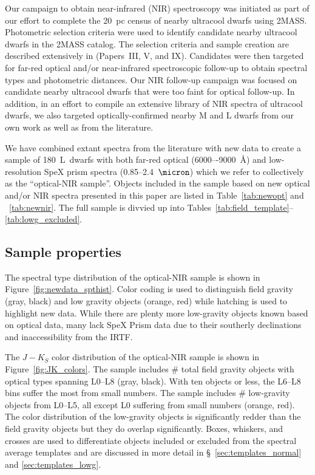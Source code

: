 \documentclass[12pt,preprint]{aastex}
\newcommand{\sample}{180}
\newcommand{\newopt}{19} %
\newcommand{\prismspectra}{140} %
\begin{document}
Our campaign to obtain near-infrared (NIR) spectroscopy was initiated as part of our effort to complete the 20~pc census of nearby ultracool dwarfs using 2MASS. Photometric selection criteria were used to identify candidate nearby ultracool dwarfs in the 2MASS catalog. The selection criteria and sample creation are described extensively in \cite{Cruz03,Cruz07,Reid08} (Papers~III, V, and IX). Candidates were then targeted for far-red optical and/or near-infrared spectroscopic follow-up to obtain spectral types and photometric distances. Our NIR follow-up campaign was focused on candidate nearby ultracool dwarfs that were too faint for optical follow-up. In addition, in an effort to compile an extensive library of NIR spectra of ultracool dwarfs, we also targeted optically-confirmed nearby M and L dwarfs from our own work as well as from the literature. 

We have combined extant spectra from the literature with new data to create a sample of \sample~L~dwarfs with both far-red optical (6000–-9000~\AA) and low-resolution SpeX prism spectra (0.85--2.4~$\micron$) which we refer to collectively as the ``optical-NIR sample''. 
Objects included in the sample based on new optical and/or NIR spectra presented in this paper are listed in Table~\ref{tab:newopt} and ~\ref{tab:newnir}. 
The full sample is divvied up into Tables~\ref{tab:field_template}--\ref{tab:lowg_excluded}.

\subsection{Sample properties}

The spectral type distribution of the optical-NIR sample is shown in Figure~\ref{fig:newdata_spthist}. Color coding is used to distinguish field gravity (gray, black) and low gravity objects (orange, red) while hatching is used to highlight new data.
While there are plenty more low-gravity objects known based on optical data, many lack SpeX Prism data due to their southerly declinations and inaccessibility from the IRTF.

The $J-K_S$ color distribution of the optical-NIR sample is shown in Figure~\ref{fig:JK_colors}. 
The sample includes \# total field gravity objects with optical types spanning L0--L8 (gray, black).
With ten objects or less, the L6--L8 bins suffer the most from small numbers.
The sample includes \# low-gravity objects from L0--L5, all except L0 suffering from small numbers (orange, red).
The color distribution of the low-gravity objects is significantly redder than the field gravity objects but they do overlap significantly.
Boxes, whiskers, and crosses are used to differentiate objects included or excluded from the spectral average templates and are discussed in more detail in \S~\ref{sec:templates_normal} and \ref{sec:templates_lowg}.
\end{document}
